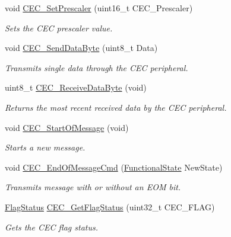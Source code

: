 \begin{DoxyCompactItemize}
void \hyperlink{group___c_e_c___private___functions_gad2fc626e28a82008a29f062975a9af11}{C\+E\+C\+\_\+\+Set\+Prescaler} (uint16\+\_\+t C\+E\+C\+\_\+\+Prescaler)
\begin{DoxyCompactList}\small\item\em Sets the C\+EC prescaler value. \end{DoxyCompactList}\item 
void \hyperlink{group___c_e_c___private___functions_ga6897ab26d8f909f9160e9fac54b97441}{C\+E\+C\+\_\+\+Send\+Data\+Byte} (uint8\+\_\+t Data)
\begin{DoxyCompactList}\small\item\em Transmits single data through the C\+EC peripheral. \end{DoxyCompactList}\item 
uint8\+\_\+t \hyperlink{group___c_e_c___private___functions_ga165837bff6292e7674eff6f8b230da97}{C\+E\+C\+\_\+\+Receive\+Data\+Byte} (void)
\begin{DoxyCompactList}\small\item\em Returns the most recent received data by the C\+EC peripheral. \end{DoxyCompactList}\item 
void \hyperlink{group___c_e_c___private___functions_ga71e700461ffe7820d9e1c75da65fd0fb}{C\+E\+C\+\_\+\+Start\+Of\+Message} (void)
\begin{DoxyCompactList}\small\item\em Starts a new message. \end{DoxyCompactList}\item 
void \hyperlink{group___c_e_c___private___functions_ga1e2cf6e3a1ac891f2814f9d3f4043574}{C\+E\+C\+\_\+\+End\+Of\+Message\+Cmd} (\hyperlink{group___exported__types_gac9a7e9a35d2513ec15c3b537aaa4fba1}{Functional\+State} New\+State)
\begin{DoxyCompactList}\small\item\em Transmits message with or without an E\+OM bit. \end{DoxyCompactList}\item 
\hyperlink{group___exported__types_ga89136caac2e14c55151f527ac02daaff}{Flag\+Status} \hyperlink{group___c_e_c___private___functions_gaf920706cb350182bf0728c66868053ca}{C\+E\+C\+\_\+\+Get\+Flag\+Status} (uint32\+\_\+t C\+E\+C\+\_\+\+F\+L\+AG)
\begin{DoxyCompactList}\small\item\em Gets the C\+EC flag status. \end{DoxyCompactList}\item 

\end{DoxyCompactItemize}

